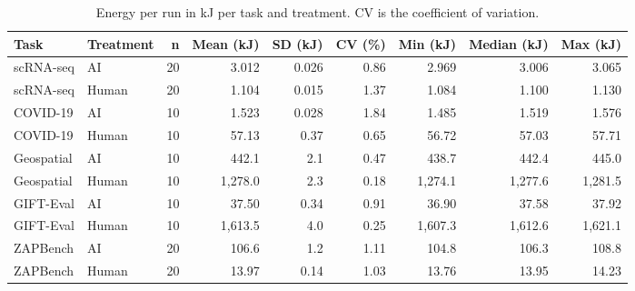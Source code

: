 \begin{table}[ht]
\centering
\caption{Energy per run in kJ per task and treatment. CV is the coefficient of variation.} 
\label{tab:08_descriptives_energy}
\begingroup\small
\begin{tabular}{llrrrrrrr}
  \toprule
Task & Treatment & n & Mean (kJ) & SD (kJ) & CV (\%) & Min (kJ) & Median (kJ) & Max (kJ) \\ 
  \midrule
scRNA-seq & AI & 20 & 3.012 & 0.026 & 0.86 & 2.969 & 3.006 & 3.065 \\ 
  scRNA-seq & Human & 20 & 1.104 & 0.015 & 1.37 & 1.084 & 1.100 & 1.130 \\ 
  COVID-19 & AI & 10 & 1.523 & 0.028 & 1.84 & 1.485 & 1.519 & 1.576 \\ 
  COVID-19 & Human & 10 & 57.13 & 0.37 & 0.65 & 56.72 & 57.03 & 57.71 \\ 
  Geospatial & AI & 10 & 442.1 & 2.1 & 0.47 & 438.7 & 442.4 & 445.0 \\ 
  Geospatial & Human & 10 & 1,278.0 & 2.3 & 0.18 & 1,274.1 & 1,277.6 & 1,281.5 \\ 
  GIFT-Eval & AI & 10 & 37.50 & 0.34 & 0.91 & 36.90 & 37.58 & 37.92 \\ 
  GIFT-Eval & Human & 10 & 1,613.5 & 4.0 & 0.25 & 1,607.3 & 1,612.6 & 1,621.1 \\ 
  ZAPBench & AI & 20 & 106.6 & 1.2 & 1.11 & 104.8 & 106.3 & 108.8 \\ 
  ZAPBench & Human & 20 & 13.97 & 0.14 & 1.03 & 13.76 & 13.95 & 14.23 \\ 
   \bottomrule
\end{tabular}
\endgroup
\end{table}
